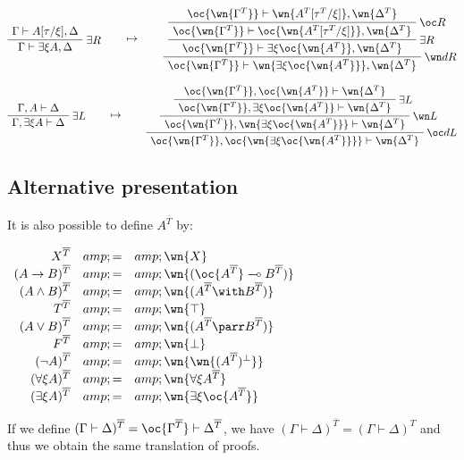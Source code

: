 \(\AxRule{\Gamma\vdash A[\tau/\xi],\Delta}
\LabelRule{\exists R}
\UnaRule{\Gamma\vdash \exists\xi A,\Delta}
\DisplayProof
\qquad\mapsto\qquad
\AxRule{\oc{\wn{\Gamma^T}}\vdash \wn{A^T[\tau^T/\xi]},\wn{\Delta^T}}
\LabelRule{\oc R}
\UnaRule{\oc{\wn{\Gamma^T}}\vdash \oc{\wn{A^T[\tau^T/\xi]}},\wn{\Delta^T}}
\LabelRule{\exists R}
\UnaRule{\oc{\wn{\Gamma^T}}\vdash \exists\xi \oc{\wn{A^T}},\wn{\Delta^T}}
\LabelRule{\wn d R}
\UnaRule{\oc{\wn{\Gamma^T}}\vdash \wn{\exists\xi \oc{\wn{A^T}}},\wn{\Delta^T}}
\DisplayProof\)

\(\AxRule{\Gamma,A\vdash \Delta}
\LabelRule{\exists L}
\UnaRule{\Gamma,\exists\xi A\vdash \Delta}
\DisplayProof
\qquad\mapsto\qquad
\AxRule{\oc{\wn{\Gamma^T}},\oc{\wn{A^T}}\vdash \wn{\Delta^T}}
\LabelRule{\exists L}
\UnaRule{\oc{\wn{\Gamma^T}},\exists\xi\oc{\wn{A^T}}\vdash \wn{\Delta^T}}
\LabelRule{\wn L}
\UnaRule{\oc{\wn{\Gamma^T}},\wn{\exists\xi\oc{\wn{A^T}}}\vdash \wn{\Delta^T}}
\LabelRule{\oc d L}
\UnaRule{\oc{\wn{\Gamma^T}},\oc{\wn{\exists\xi\oc{\wn{A^T}}}}\vdash \wn{\Delta^T}}
\DisplayProof\)

\subsection{Alternative presentation}\label{alternative-presentation}

It is also possible to define \(A^{\overline{T}}\) by:

\(\begin{array}{rcl}
X^{\overline{T}} &amp; = &amp; \wn{X} \\
(A\imp B)^{\overline{T}} &amp; = &amp; \wn{(\oc{A^{\overline{T}}}\limp B^{\overline{T}})} \\
(A\wedge B)^{\overline{T}} &amp; = &amp; \wn{(A^{\overline{T}} \with B^{\overline{T}})} \\
T^{\overline{T}} &amp; = &amp; \wn{\top} \\
(A\vee B)^{\overline{T}} &amp; = &amp; \wn{(A^{\overline{T}}\parr B^{\overline{T}})} \\
F^{\overline{T}} &amp; = &amp; \wn{\bot} \\
(\neg A)^{\overline{T}} &amp; = &amp; \wn{\wn{(A^{\overline{T}})\orth}} \\
(\forall\xi A)^{\overline{T}} &amp; = &amp; \wn{\forall\xi A^{\overline{T}}} \\
(\exists\xi A)^{\overline{T}} &amp; = &amp; \wn{\exists\xi \oc{A^{\overline{T}}}}
\end{array}\)

If we define
\((\Gamma\vdash\Delta)^{\overline{T}} = \oc{\Gamma^{\overline{T}}}\vdash \Delta^{\overline{T}}\),
we have \((\Gamma\vdash\Delta)^{\overline{T}} = (\Gamma\vdash\Delta)^T\)
and thus we obtain the same translation of proofs.

